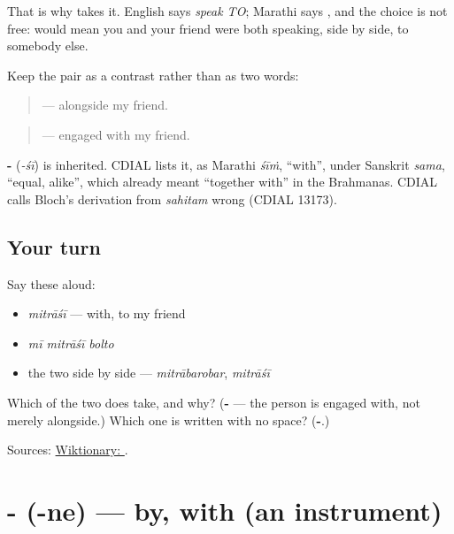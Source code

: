 That is why \textbf{} takes it. English says \emph{speak TO}; Marathi says \textbf{}, and the choice is not free: \textbf{ } would mean you and your friend were both speaking, side by side, to somebody else.

Keep the pair as a contrast rather than as two words:

\begin{quote}
\textbf{} — alongside my friend.
\end{quote}

\begin{quote}
\textbf{} — engaged with my friend.
\end{quote}

\begin{cousinweb}
\textbf{-} (\emph{-śī}) is inherited. CDIAL lists it, as Marathi \emph{śīṁ}, \textquotedblleft{}with\textquotedblright{}, under Sanskrit \emph{sama}, \textquotedblleft{}equal, alike\textquotedblright{}, which already meant \textquotedblleft{}together with\textquotedblright{} in the Brahmanas. CDIAL calls Bloch's derivation from \emph{sahitam} wrong (CDIAL 13173).
\end{cousinweb}

\subsection*{Your turn}
Say these aloud:

\begin{itemize}
\raggedright
  \item \emph{mitrāśī} — with, to my friend
  \item \emph{mī mitrāśī bolto}
  \item the two side by side — \emph{mitrābarobar}, \emph{mitrāśī}
\end{itemize}

\begin{tcolorbox}[breakable,colback=teal!4,colframe=teal!35!black,title={Before you move on}]
Which of the two does \textbf{} take, and why? (\textbf{-} — the person is engaged with, not merely alongside.) Which one is written with no space? (\textbf{-}.)

Sources: \href{https://en.wiktionary.org/wiki/\%E0\%A4\%B6\%E0\%A5\%80}{Wiktionary: }.
\end{tcolorbox}
\section[\texorpdfstring{-\mr{ने} (-ne)}{-ने (-ne)}]{- (-ne) — by, with (an instrument)}

